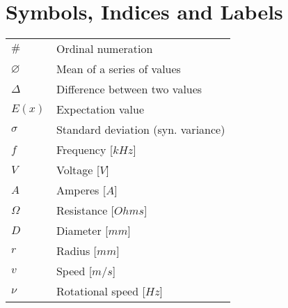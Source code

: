 \section*{Symbols, Indices and Labels}
{\renewcommand{\arraystretch}{1.1} \renewcommand{\tabcolsep}{0.2cm}
\begin{tabular}[h]{@{}p{} @{}p{}@{}}
$\#$            &Ordinal numeration\\
$\varnothing$   &Mean of a series of values\\
$\Delta$        &Difference between two values\\
$E(x)$          &Expectation value\\
$\sigma$        &Standard deviation (syn. variance)\vspace{13pt}\\
$f$             &Frequency [$kHz$]\\
$V$             &Voltage [$V$]\\    
$A$             &Amperes [$A$]\\
$\Omega$        &Resistance [$Ohms$]\\
$D$             &Diameter [$mm$]\\
$r$             &Radius [$mm$]\\
$v$             &Speed [$m/s$]\\
$\nu$           &Rotational speed [$Hz$]
\end{tabular}
}